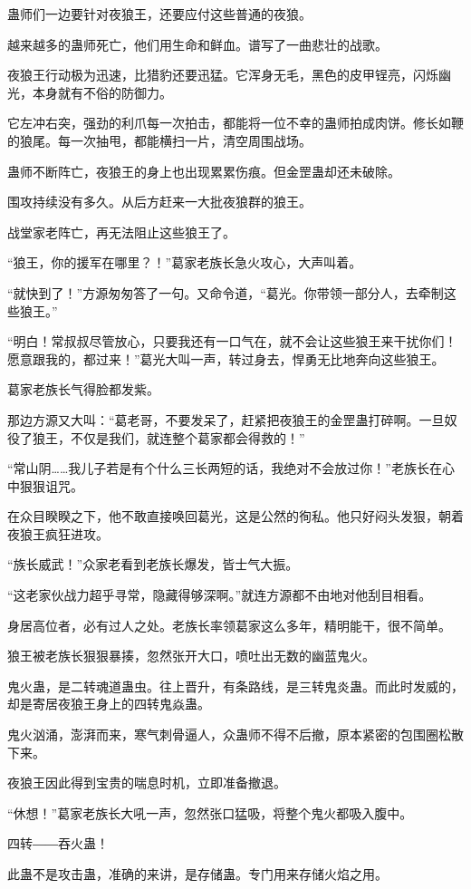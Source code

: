 \begin{this_body}
蛊师们一边要针对夜狼王，还要应付这些普通的夜狼。

越来越多的蛊师死亡，他们用生命和鲜血。谱写了一曲悲壮的战歌。

夜狼王行动极为迅速，比猎豹还要迅猛。它浑身无毛，黑色的皮甲锃亮，闪烁幽光，本身就有不俗的防御力。

它左冲右突，强劲的利爪每一次拍击，都能将一位不幸的蛊师拍成肉饼。修长如鞭的狼尾。每一次抽甩，都能横扫一片，清空周围战场。

蛊师不断阵亡，夜狼王的身上也出现累累伤痕。但金罡蛊却还未破除。

围攻持续没有多久。从后方赶来一大批夜狼群的狼王。

战堂家老阵亡，再无法阻止这些狼王了。

“狼王，你的援军在哪里？！”葛家老族长急火攻心，大声叫着。

“就快到了！”方源匆匆答了一句。又命令道，“葛光。你带领一部分人，去牵制这些狼王。”

“明白！常叔叔尽管放心，只要我还有一口气在，就不会让这些狼王来干扰你们！愿意跟我的，都过来！”葛光大叫一声，转过身去，悍勇无比地奔向这些狼王。

葛家老族长气得脸都发紫。

那边方源又大叫：“葛老哥，不要发呆了，赶紧把夜狼王的金罡蛊打碎啊。一旦奴役了狼王，不仅是我们，就连整个葛家都会得救的！”

“常山阴……我儿子若是有个什么三长两短的话，我绝对不会放过你！”老族长在心中狠狠诅咒。

在众目睽睽之下，他不敢直接唤回葛光，这是公然的徇私。他只好闷头发狠，朝着夜狼王疯狂进攻。

“族长威武！”众家老看到老族长爆发，皆士气大振。

“这老家伙战力超乎寻常，隐藏得够深啊。”就连方源都不由地对他刮目相看。

身居高位者，必有过人之处。老族长率领葛家这么多年，精明能干，很不简单。

狼王被老族长狠狠暴揍，忽然张开大口，喷吐出无数的幽蓝鬼火。

鬼火蛊，是二转魂道蛊虫。往上晋升，有条路线，是三转鬼炎蛊。而此时发威的，却是寄居夜狼王身上的四转鬼焱蛊。

鬼火汹涌，澎湃而来，寒气刺骨逼人，众蛊师不得不后撤，原本紧密的包围圈松散下来。

夜狼王因此得到宝贵的喘息时机，立即准备撤退。

“休想！”葛家老族长大吼一声，忽然张口猛吸，将整个鬼火都吸入腹中。

四转――吞火蛊！

此蛊不是攻击蛊，准确的来讲，是存储蛊。专门用来存储火焰之用。


\end{this_body}
